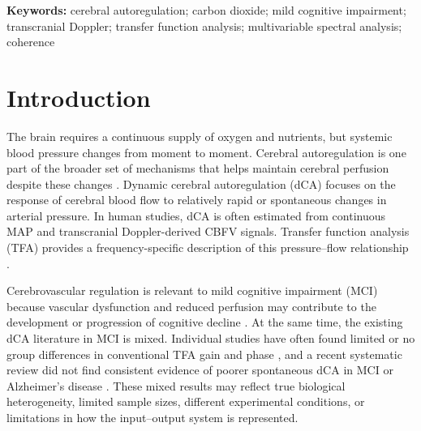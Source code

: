\documentclass[12pt]{article}
\newcommand{\PETCOtwo}{P_{\mathrm{ET}}CO_2}
\newcommand{\COtwo}{CO_2}
\begin{document}
\begin{abstract}
\textbf{Conclusions:} Modeling MAP and $\PETCOtwo$ together materially
changed pathway-specific gain estimates, particularly for the $\COtwo$
pathway. These results support the methodological premise that MAP-only and
$\COtwo$-only SISO estimates are not interchangeable with conditional MISO
estimates. However, the present data did not support the prespecified
hypothesis of a broad band-level difference in conditional cerebral
hemodynamics between NC and MCI. The isolated 0.1484-Hz group difference is
hypothesis-generating and requires confirmation.
\end{abstract}

\noindent\textbf{Keywords:} cerebral autoregulation; carbon dioxide; mild
cognitive impairment; transcranial Doppler; transfer function analysis;
multivariable spectral analysis; coherence

\newpage
\tableofcontents
\newpage

\section{Introduction}

The brain requires a continuous supply of oxygen and nutrients, but systemic
blood pressure changes from moment to moment. Cerebral autoregulation is one
part of the broader set of mechanisms that helps maintain cerebral perfusion
despite these changes \cite{Claassen2021}. Dynamic cerebral autoregulation
(dCA) focuses on the response of cerebral blood flow to relatively rapid or
spontaneous changes in arterial pressure. In human studies, dCA is often
estimated from continuous MAP and transcranial Doppler-derived CBFV signals.
Transfer function analysis (TFA) provides a frequency-specific description of
this pressure--flow relationship \cite{Panerai2023}.

Cerebrovascular regulation is relevant to mild cognitive impairment (MCI)
because vascular dysfunction and reduced perfusion may contribute to the
development or progression of cognitive decline \cite{Kisler2017,Beishon2017}.
At the same time, the existing dCA literature in MCI is mixed. Individual
studies have often found limited or no group differences in conventional
TFA gain and phase \cite{Gommer2012,Tarumi2014}, and a recent systematic review
did not find consistent evidence of poorer spontaneous dCA in MCI or
Alzheimer's disease \cite{Heutz2023}. These mixed results may reflect true
biological heterogeneity, limited sample sizes, different experimental
conditions, or limitations in how the input--output system is represented.
\end{document}
